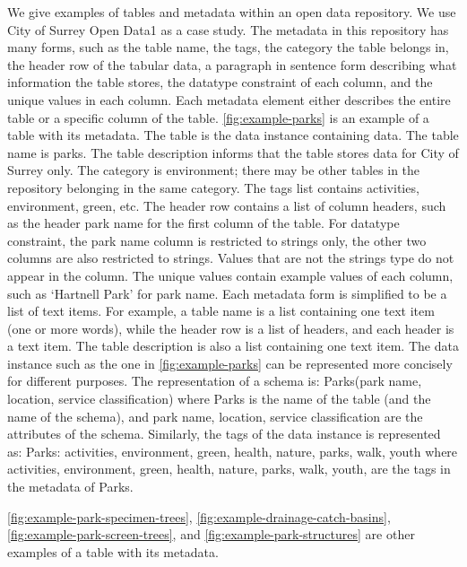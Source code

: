 We give examples of tables and metadata within an open data repository. We use City of Surrey Open Data1 as a case study. The metadata in this repository has many forms, such as the table name, the tags, the category the table belongs in, the header row of the tabular data, a paragraph in sentence form describing what information the table stores, the datatype constraint of each column, and the unique values in each column. Each metadata element either describes the entire table or a specific column of the table. \autoref{fig:example-parks} is an example of a table with its metadata. The table is the data instance containing data. The table name is parks. The table description informs that the table stores data for City of Surrey only. The category is environment; there may be other tables in the repository belonging in the same category. The tags list contains activities, environment, green, etc. The header row contains a list of column headers, such as the header park name for the first column of the table. For datatype constraint, the park name column is restricted to strings only, the other two columns are also restricted to strings. Values that are not the strings type do not appear in the column. The unique values contain example values of each column, such as ‘Hartnell Park’ for park name.
Each metadata form is simplified to be a list of text items. For example, a table name is a list containing one text item (one or more words), while the header row is a list of headers, and each header is a text item. The table description is also a list containing one text item.
The data instance such as the one in \autoref{fig:example-parks} can be represented more concisely for different purposes. The representation of a schema is:
Parks(park name, location, service classification)
where Parks is the name of the table (and the name of the schema), and park name, location, service classification are the attributes of the schema.
Similarly, the tags of the data instance is represented as:
Parks: {activities, environment, green, health, nature, parks, walk, youth}
where activities, environment, green, health, nature, parks, walk, youth, are the tags in the metadata of Parks.

\autoref{fig:example-park-specimen-trees}, \autoref{fig:example-drainage-catch-basins}, \autoref{fig:example-park-screen-trees}, and \autoref{fig:example-park-structures} are other examples of a table with its metadata.

